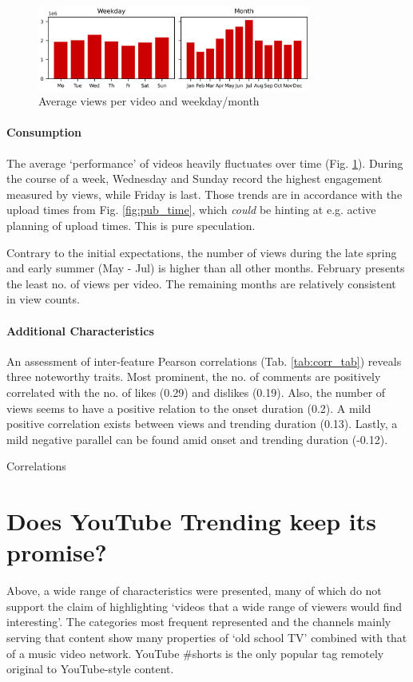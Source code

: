 \documentclass{article}
\begin{document}
\begin{figure}[ht]
    \centering
    \includegraphics[width=0.8\textwidth]{fig/views.png}
    \caption{Average views per video and weekday/month}
    \label{fig:views}
\end{figure}

\paragraph{Consumption} The average `performance' of videos heavily fluctuates over time (Fig. \ref{fig:views}). During the course of a week, Wednesday and Sunday record the highest engagement measured by views, while Friday is last. Those trends are in accordance with the upload times from Fig. \ref{fig:pub_time}, which \textit{could} be hinting at e.g. active planning of upload times. This is pure speculation.

Contrary to the initial expectations, the number of views during the late spring and early summer (May - Jul) is higher than all other months. February presents the least no. of views per video. The remaining months are relatively consistent in view counts.

\paragraph{Additional Characteristics} An assessment of inter-feature Pearson correlations (Tab. \ref{tab:corr_tab}) reveals three noteworthy traits. Most prominent, the no. of comments are positively correlated with the no. of likes (0.29) and dislikes (0.19). Also, the number of views seems to have a positive relation to the onset duration (0.2). A mild positive correlation exists between views and trending duration (0.13). Lastly, a mild negative parallel can be found amid onset and trending duration (-0.12).

\begin{table}[h]
    \centering
    \caption{Correlations}
    \resizebox{0.875\textwidth}{!}{
        
    }
    \label{tab:corr_tab}
\end{table}

\section{Does YouTube Trending keep its promise?}
Above, a wide range of characteristics were presented, many of which do not support the claim of highlighting ‘videos that a wide range of viewers would find interesting’. The categories most frequent represented and the channels mainly serving that content show many properties of `old school TV' combined with that of a music video network. YouTube \#shorts is the only popular tag remotely original to YouTube-style content. 
\end{document}
